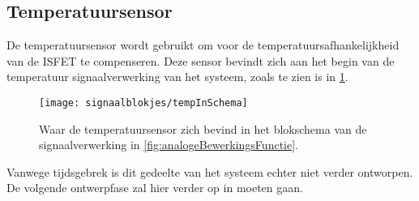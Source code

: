 \subsection{Temperatuursensor}
De temperatuursensor wordt gebruikt om voor de temperatuursafhankelijkheid van de ISFET te compenseren. Deze sensor bevindt zich aan het begin van de temperatuur signaalverwerking van het systeem, zoals te zien is in \cref{fig:tempInSchema}.

\begin{figure}[!htbp]
    \centering
    \texttt{[image: signaalblokjes/tempInSchema]}
    \caption{Waar de temperatuursensor zich bevind in het blokschema van de signaalverwerking in \cref{fig:analogeBewerkingsFunctie}.}
    \label{fig:tempInSchema}
\end{figure}

Vanwege tijdsgebrek is dit gedeelte van het systeem echter niet verder ontworpen. De volgende ontwerpfase zal hier verder op in moeten gaan.